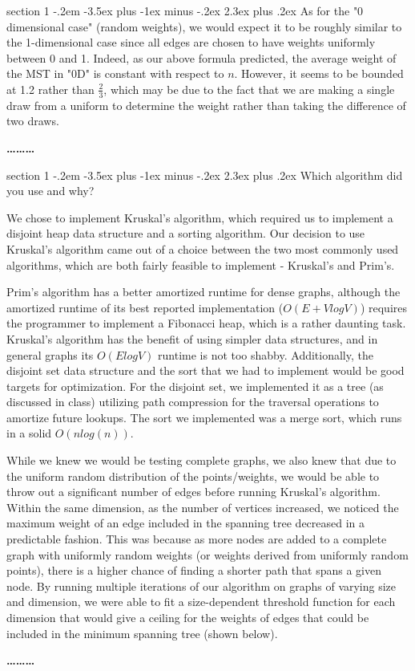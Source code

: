 \documentclass[12pt]{article}
\makeatletter
\newenvironment{problem}{\@startsection
       {section}
       {1}
       {-.2em}
       {-3.5ex plus -1ex minus -.2ex}
       {2.3ex plus .2ex}
       {\pagebreak[3]%
       \large\bf\noindent{Problem }
       }
       }
       {%
       \begin{center}\large\bf \ldots\ldots\ldots\end{center}}
\makeatother
\begin{document}
\begin{problem}{}
As for the "0 dimensional case" (random weights), we would expect it to be roughly similar to the 1-dimensional case since all edges are chosen to have weights uniformly between 0 and 1.  Indeed, as our above formula predicted, the average weight of the MST in "0D" is constant with respect to $n$.  However, it seems to be bounded at 1.2 rather than $\frac{2}{3}$, which may be due to the fact that we are making a single draw from a uniform to determine the weight rather than taking the difference of two draws.

\end{problem}

\begin{problem}{}
Which algorithm did you use and why?

We chose to implement Kruskal's algorithm, which required us to implement a disjoint heap data structure and a sorting algorithm.  Our decision to use Kruskal's algorithm came out of a choice between the two most commonly used algorithms, which are both fairly feasible to implement - Kruskal's and Prim's.

Prim's algorithm has a better amortized runtime for dense graphs, although the amortized runtime of its best reported implementation ($O(E + VlogV)$) requires the programmer to implement a Fibonacci heap, which is a rather daunting task.  Kruskal's algorithm has the benefit of using simpler data structures, and in general graphs its $O(ElogV)$ runtime is not too shabby.  Additionally, the disjoint set data structure and the sort that we had to implement would be good targets for optimization.  For the disjoint set, we implemented it as a tree (as discussed in class) utilizing path compression for the traversal operations to amortize future lookups.  The sort we implemented was a merge sort, which runs in a solid $O(nlog(n))$.

While we knew we would be testing complete graphs, we also knew that due to the uniform random distribution of the points/weights, we would be able to throw out a significant number of edges before running Kruskal's algorithm.  Within the same dimension, as the number of vertices increased, we noticed the maximum weight of an edge included in the spanning tree decreased in a predictable fashion.  This was because as more nodes are added to a complete graph with uniformly random weights (or weights derived from uniformly random points), there is a higher chance of finding a shorter path that spans a given node.  By running multiple iterations of our algorithm on graphs of varying size and dimension, we were able to fit a size-dependent threshold function for each dimension that would give a ceiling for the weights of edges that could be included in the minimum spanning tree (shown below).


\end{problem}
\end{document}
